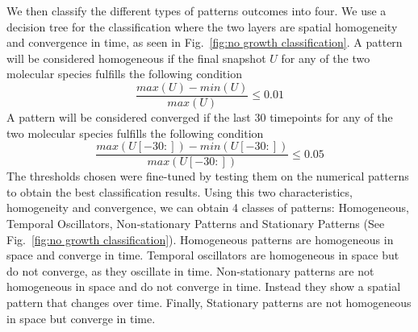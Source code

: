 We then classify the different types of patterns outcomes into four.
We use a decision tree for the classification where the two layers are spatial homogeneity and convergence in time, as seen in Fig.~\ref{fig:no growth classification}.
A pattern will be considered homogeneous if the final snapshot $U$ for any of the two molecular species fulfills the following condition
\begin{equation}
    \frac{max(U) - min(U)}{max(U)} \leq 0.01
\end{equation}
A pattern will be considered converged if the last 30 timepoints for any of the two molecular species fulfills the following condition
\begin{equation}
    \frac{max(U[-30:]) - min(U[-30:])}{max(U[-30:])} \leq 0.05
\end{equation}
The thresholds chosen were fine-tuned by testing them on the numerical patterns to obtain the best classification results.
Using this two characteristics, homogeneity and convergence, we can obtain 4 classes of patterns: Homogeneous, Temporal Oscillators, Non-stationary Patterns and Stationary Patterns (See Fig.~\ref{fig:no growth classification}).
Homogeneous patterns are homogeneous in space and converge in time.
Temporal oscillators are homogeneous in space but do not converge, as they oscillate in time.
Non-stationary patterns are not homogeneous in space and do not converge in time.
Instead they show a spatial pattern that changes over time.
Finally, Stationary patterns are not homogeneous in space but converge in time.


